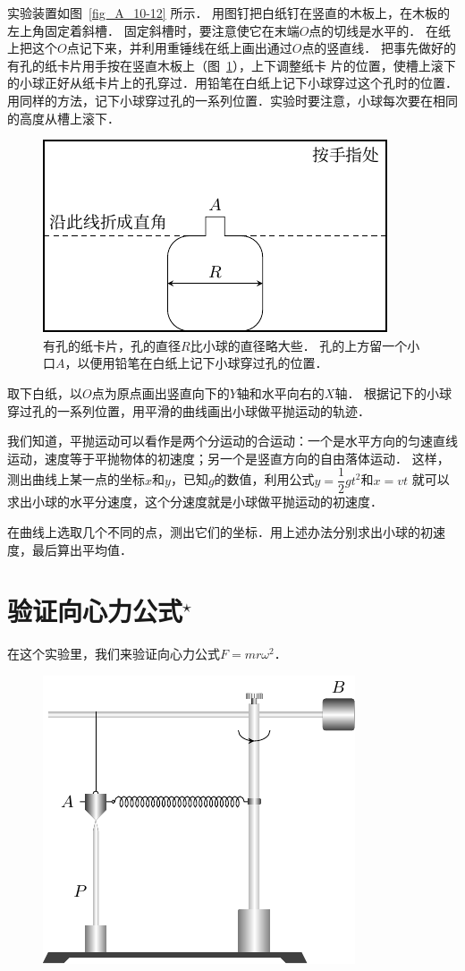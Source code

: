 实验装置如图~\ref{fig_A_10-12} 所示．
用图钉把白纸钉在竖直的木板上，在木板的左上角固定着斜槽．
固定斜槽时，要注意使它在末端$O$点的切线是水平的．
在纸上把这个$O$点记下来，并利用重锤线在纸上画出通过$O$点的竖直线．
把事先做好的有孔的纸卡片用手按在竖直木板上（图~\ref{fig_A_10-13}），上下调整纸卡
片的位置，使槽上滚下的小球正好从纸卡片上的孔穿过．用铅笔在白纸上记下小球穿过这个孔时的位置．用同样的方法，记下小球穿过孔的一系列位置．实验时要注意，小球每次要在相同的高度从槽上滚下．
\begin{figure}[htbp]
    \centering
    \includegraphics{fig/A/10-13.pdf}
    \caption{有孔的纸卡片，孔的直径$R$比小球的直径略大些．
    孔的上方留一个小口$A$，以便用铅笔在白纸上记下小球穿过孔的位置．}\label{fig_A_10-13}
\end{figure}

取下白纸，以$O$点为原点画出竖直向下的$Y$轴和水平向右的$X$轴．
根据记下的小球穿过孔的一系列位置，用平滑的曲线画出小球做平抛运动的轨迹．

我们知道，平抛运动可以看作是两个分运动的合运动：一个是水平方向的匀速直线运动，速度等于平抛物体的初速度；另一个是竖直方向的自由落体运动．
这样，测出曲线上某一点的坐标$x$和$y$，已知$g$的数值，利用公式$y=\dfrac{1}{2}gt^2$和$x=vt$
就可以求出小球的水平分速度，这个分速度就是小球做平抛运动的初速度．

在曲线上选取几个不同的点，测出它们的坐标．用上述办法分别求出小球的初速度，最后算出平均值．

\section{验证向心力公式$^\star$}
在这个实验里，我们来验证向心力公式$F=mr\omega^2$．
\begin{figure}[htbp]
    \centering
    \includegraphics{fig/A/10-14.pdf}
    \caption{}\label{fig_A_10-14}
\end{figure}

